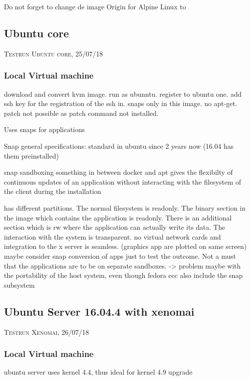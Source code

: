 \documentclass[]{scrartcl}
\begin{document}
Do not forget to change de image Origin for Alpine Linux to 

\subsection{Ubuntu core}
{\small\textsc{Testrun Ubuntu core, 25/07/18} \bigskip}


\subsubsection{Local Virtual machine}
download and convert kvm image. run as ubunntu. register to ubuntu one. add ssh key for the registration of the ssh in. snaps only in this image. no apt-get. patch not possible as patch command not installed.

Uses snaps for applications

Snap general specifications:
standard in ubuntu since 2 years now (16.04 has them preinstalled)

snap sandboxing
something in between docker and apt
gives the flexibilty of continuous updates of an application without interacting with the filesystem of the client during the installation

has different partitions. The normal filesystem is readonly. The binary section in the image which contains the application is readonly. There is an additional section which is rw where the application can actually write its data. 
The interaction with the system is transparent. no virtual network cards and integration to the x server is seamless. (graphics app are plotted on same screen)
maybe consider snap conversion of apps just to test the outcome. Not a must that the applications are to be on separate sandboxes. -> problem maybe with the portability of the host system, even though fedora ecc also include the snap subsystem

\subsection{Ubuntu Server 16.04.4 with xenomai}

{\small\textsc{Testrun Xenomai, 26/07/18} \bigskip}

\subsubsection{Local Virtual machine}

ubuntu server uses kernel 4.4, thus ideal for kernel 4.9 upgrade
\end{document}
